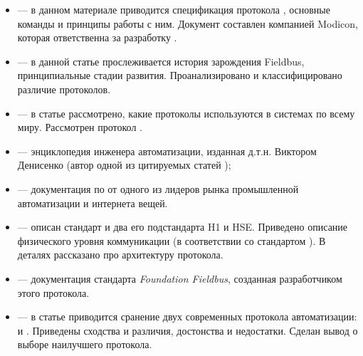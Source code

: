 \begin{itemize}[label=]
	\item \cite{swales_open_1999} --- в данном материале приводится спецификация протокола \mb, основные команды и принципы работы с ним. Документ составлен компанией Modicon, которая ответственна за разработку \mb.
	\item \cite{thomesse_fieldbus_2005} --- в данной статье прослеживается история зарождения Fieldbus, принципиальные стадии развития. Проанализировано и классифицировано различие протоколов.
	\item \cite{promwad__2019-1} --- в статье рассмотрено, какие протоколы используются в системах по всему миру. Рассмотрен протокол \pb.
	\item \cite{__2015} --- энциклопедия инженера автоматизации, изданная д.т.н. Виктором Денисенко (автор одной из цитируемых статей \cite{__2010});
	\item \cite{acromag_introduction_2002} --- документация по \pb от одного из лидеров рынка промышленной автоматизации и интернета вещей.
	\item \cite{vincent_foundation_2001} --- описан стандарт \ffb и два его подстандарта H1 и HSE. Приведено описание физического уровня коммуникации (в соответствии со стандартом \osi). В деталях рассказано про архитектуру протокола.
	\item \cite{noauthor_foundation_2001} --- документация стандарта \textit{Foundation Fieldbus}, созданная разработчиком этого протокола.
	\item \cite{_foundation_1999} --- в статье приводится сранение двух современных протокола автоматизации: \pb и \ffb. Приведены сходства и различия, достонства и недостатки. Сделан вывод о выборе наилучшего протокола.
\end{itemize}